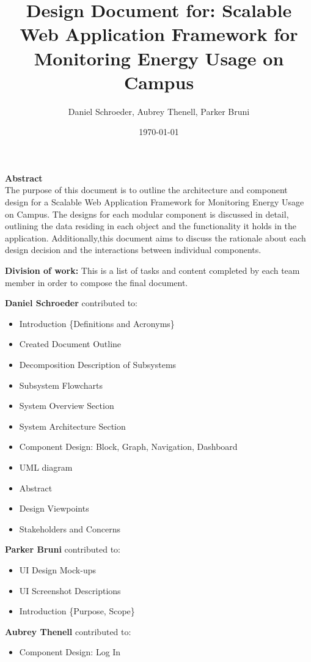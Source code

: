 \documentclass[journal,10pt,onecolumn,compsoc]{IEEEtran}
\title{Design Document for: \linebreak Scalable Web Application Framework for Monitoring Energy Usage on Campus}
\author{Daniel Schroeder, Aubrey Thenell, Parker Bruni}
\date{\today}
\begin{document}
    \maketitle
    \vspace{2cm}
    \begin{center}
    \noindent \textbf{Abstract} \\
                \indent The purpose of this document is to outline the architecture and component design for a Scalable Web Application Framework for Monitoring Energy Usage on Campus. The designs for each modular component is discussed in detail, outlining the data residing in each object and the functionality it holds in the application. Additionally,this document aims to discuss the rationale about each design decision and the interactions between individual components. 
    \end{center}         
    
    \newpage
    \tableofcontents
    \newpage
       \noindent\textbf{Division of work:}
       \noindent This is a list of tasks and content completed by each team member in order to compose the final document.
       
       \noindent\textbf{Daniel Schroeder} contributed to: 
       \begin{itemize}
           \item Introduction \{Definitions and Acronyms\}
           \item Created Document Outline 
           \item Decomposition Description of Subsystems
           \item Subsystem Flowcharts
           \item System Overview Section
           \item System Architecture Section
           \item Component Design: Block, Graph, Navigation, Dashboard
           \item UML diagram
           \item Abstract
           \item Design Viewpoints
           \item Stakeholders and Concerns
       \end{itemize}
       \noindent\textbf{Parker Bruni} contributed to:
       \begin{itemize}
           \item UI Design Mock-ups
           \item UI Screenshot Descriptions
           \item Introduction \{Purpose, Scope\}
       \end{itemize}
       \noindent\textbf{Aubrey Thenell} contributed to:
       \begin{itemize} 
         \item Component Design: Log In
       \end{itemize}
       
\end{document}

